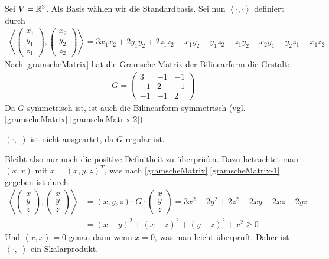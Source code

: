 Sei $V = \mathbb{R}^3$. Als Basis wählen wir die Standardbasis. Sei nun $\left\langle \cdot , \cdot \right\rangle$ definiert durch
\begin{align*}
    \left\langle
    \begin{pmatrix}
        x_1\\y_1\\z_1
    \end{pmatrix},
    \begin{pmatrix}
        x_2\\y_2\\z_2
    \end{pmatrix}
    \right\rangle = 3 x_1 x_2 + 2 y_1 y_2 + 2 z_1 z_2 - x_1 y_2 - y_1 z_2 - z_1 y_2 - x_2 y_1 - y_2 z_1 - x_1 z_2
\end{align*}
Nach \ref{gramscheMatrix} hat die Gramsche Matrix der Bilinearform die Gestalt:
\begin{align*}
    G =
    \begin{pmatrix}
        3 & -1 & -1\\
        -1 & 2 & -1\\
        -1 & -1 & 2
    \end{pmatrix}
\end{align*}
Da $G$ symmetrisch ist, ist auch die Bilinearform symmetrisch (vgl. \ref{gramscheMatrix}.\ref{gramscheMatrix-2}).

$(\cdot , \cdot)$ ist nicht ausgeartet, da $G$ regulär ist.

Bleibt also nur noch die positive Definitheit zu überprüfen.
Dazu betrachtet man $(x, x)$ mit $x = (x, y, z)^T$, was nach \ref{gramscheMatrix}.\ref{gramscheMatrix-1} gegeben ist durch
\begin{align*}
    \left\langle
    \begin{pmatrix}
        x\\y\\z
    \end{pmatrix},
    \begin{pmatrix}
        x\\y\\z
    \end{pmatrix}
    \right\rangle & = (x,y,z) \cdot G \cdot
    \begin{pmatrix}
        x\\y\\z
    \end{pmatrix} = 3x^2+2y^2+2z^2-2xy-2xz-2yz \\
    & = (x - y)^2 + (x - z)^2 + (y - z)^2 + x^2 \geq 0
\end{align*}
Und $\left\langle x, x \right\rangle = 0$ genau dann wenn $x = 0$, was man leicht überprüft.
Daher ist $\left\langle \cdot , \cdot \right\rangle$ ein Skalarprodukt.\\

